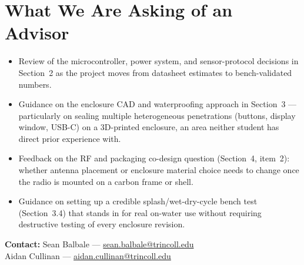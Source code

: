\documentclass[11pt]{article}
\begin{document}
\section{What We Are Asking of an Advisor}
\begin{itemize}[topsep=2pt,itemsep=2pt]
    \item Review of the microcontroller, power system, and sensor-protocol decisions in Section~2 as the project moves from datasheet estimates to bench-validated numbers.
    \item Guidance on the enclosure CAD and waterproofing approach in Section~3 --- particularly on sealing multiple heterogeneous penetrations (buttons, display window, USB-C) on a 3D-printed enclosure, an area neither student has direct prior experience with.
    \item Feedback on the RF and packaging co-design question (Section~4, item~2): whether antenna placement or enclosure material choice needs to change once the radio is mounted on a carbon frame or shell.
    \item Guidance on setting up a credible splash/wet-dry-cycle bench test (Section~3.4) that stands in for real on-water use without requiring destructive testing of every enclosure revision.
\end{itemize}

\vspace{6pt}
\textbf{Contact:} Sean Balbale --- \href{mailto:sean.balbale@trincoll.edu}{sean.balbale@trincoll.edu}\\
Aidan Cullinan --- \href{mailto:aidan.cullinan@trincoll.edu}{aidan.cullinan@trincoll.edu}
\end{document}
